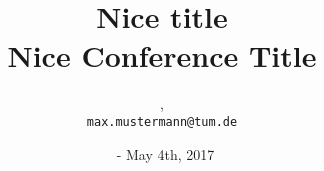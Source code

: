 \documentclass[t]{beamer}
\title{Nice title\\ \vskip 2cm {\large Nice Conference Title}}
\author{\vskip 5cm \PersonTitel{} \PersonVorname{} \PersonNachname{},  \PersonCoauthors{} \\  \texttt{max.mustermann@tum.de}}
\institute[]{\vskip 0.2cm \LehrstuhlName\\ \UniversitaetName }
\date[\Datum]{\vspace{1.5cm} \PersonStadt~- May 4th, 2017}
\begin{document}
\setlength{\baselineskip}{\PraesentationAbstandAbsatz}
\setlength{\parskip}{\baselineskip}

\PraesentationMasterStandard
\PraesentationTitelseite %




\PraesentationMasterWeissBlau
\PraesentationStartseiteFlaggen
\end{document}
